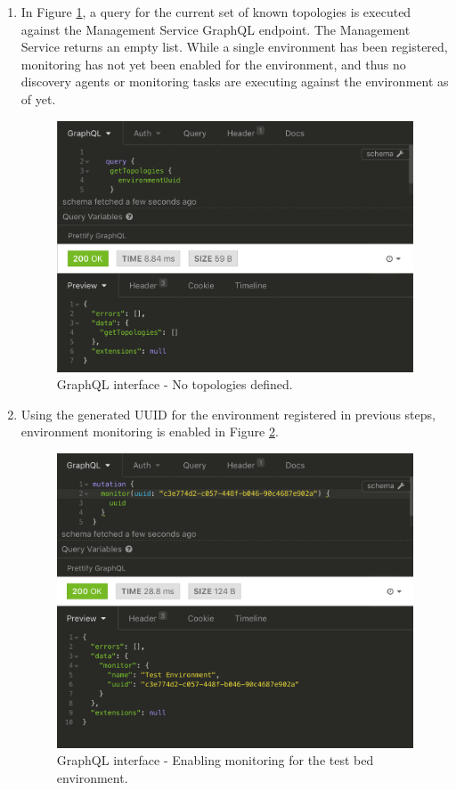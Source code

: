\begin{enumerate}
\item  In Figure \ref {walkthough_list_topologies_empty}, a query for the current set of known topologies is executed against the Management Service GraphQL endpoint. The Management Service returns an empty list. While a single environment has been registered, monitoring has not yet been enabled for the environment, and thus no discovery agents or monitoring tasks are executing against the environment as of yet.

 \begin{figure}[H]
	\centering  
	\includegraphics[scale=0.6]{figures/walkthrough/no_topologies.png}
	\caption{GraphQL interface -  No topologies defined.}
	\label{walkthough_list_topologies_empty}
\end{figure}

\item  Using the generated UUID for the environment registered in previous steps, environment monitoring is enabled in Figure \ref{walkthough_enabled_monitoring}.

 \begin{figure}[H]
	\centering  
	\includegraphics[scale=0.6]{figures/walkthrough/enable_monitoring.png}
	\caption{GraphQL interface -  Enabling monitoring for the test bed environment.}
	\label{walkthough_enabled_monitoring}
\end{figure}


\end{enumerate}

